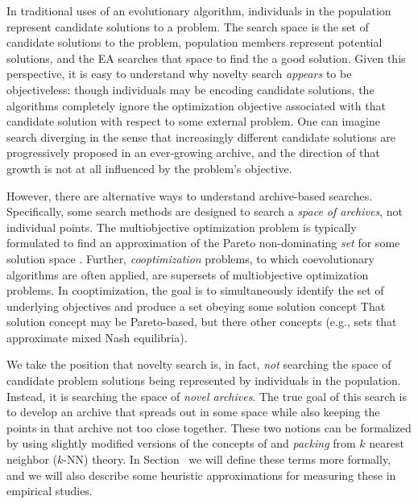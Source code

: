 \documentclass[twoside]{article}
\begin{document}
In traditional uses of an evolutionary algorithm, individuals in the population represent candidate solutions to a problem.  The search space is the set of candidate solutions to the problem, population members represent potential solutions, and the EA searches that space to find the a good solution.  Given this perspective, it is easy to understand why novelty search \emph{appears} to be objectiveless:  though individuals may be encoding candidate solutions, the algorithms completely ignore the optimization objective associated with that candidate solution with respect to some external problem.  One can imagine search diverging in the sense that increasingly different candidate solutions are progressively proposed in an ever-growing archive, and the direction of that growth is not at all influenced by the problem's objective.  

However, there are alternative ways to understand archive-based searches.  Specifically, some search methods are designed to search a \emph{space of archives}, not individual points.  The multiobjective optimization problem is typically formulated to find an approximation of the Pareto non-dominating \emph{set} for some solution space \citep{SeadaDeb2018moo,Zitzler2012}.  
Further, \emph{cooptimization} problems, to which coevolutionary algorithms are often applied, are supersets of multiobjective optimization problems.  In cooptimization, the goal is to simultaneously identify the set of underlying objectives and produce a set obeying some solution concept \citep{FiciciPollack2001ecal,Ficici2008mpsn}
That solution concept may be Pareto-based, but there other concepts (e.g., sets that approximate mixed Nash equilibria).

We take the position that novelty search is, in fact, \emph{not} searching the space of candidate problem solutions being represented by individuals in the population.  Instead, it is searching the space of \emph{novel archives}.  The true goal of this search is to develop an archive that spreads out in some space while also keeping the points in that archive not too close together.  These two notions can be formalized by using slightly modified versions of the concepts of  and \emph{packing} from $k$ nearest neighbor ($k$-NN) theory.  In Section~\pageref{subsec:knn} we will define these terms more formally, and we will also describe some heuristic approximations for measuring these in empirical studies.
\end{document}
